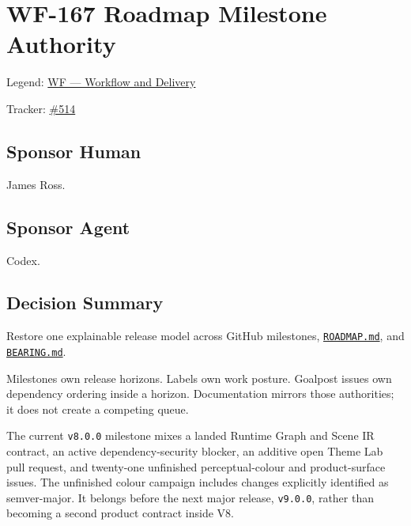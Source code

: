 \chapter{WF-167 Roadmap Milestone Authority}\label{record-249}

\smallskip

Legend: \href{https://github.com/flyingrobots/bijou/blob/1853ad902f6bf219326409e7f743a5a1d6517dbc/docs/legends/WF-workflow-and-delivery.md}{WF --- Workflow and Delivery}

Tracker: \href{https://github.com/flyingrobots/bijou/issues/514}{\#514}

\section{Sponsor Human}\label{record-249-sponsor-human}

James Ross.

\section{Sponsor Agent}\label{record-249-sponsor-agent}

Codex.

\section{Decision Summary}\label{record-249-decision-summary}

Restore one explainable release model across GitHub milestones, \href{https://github.com/flyingrobots/bijou/blob/5b10cb89165b76673ffc60da59d7de5a531e55e9/docs/ROADMAP.md}{\texttt{R\allowbreak{}O\allowbreak{}A\allowbreak{}D\allowbreak{}M\allowbreak{}A\allowbreak{}P\allowbreak{}.\allowbreak{}m\allowbreak{}d}}, and \href{https://github.com/flyingrobots/bijou/blob/5b10cb89165b76673ffc60da59d7de5a531e55e9/docs/BEARING.md}{\texttt{B\allowbreak{}E\allowbreak{}A\allowbreak{}R\allowbreak{}I\allowbreak{}N\allowbreak{}G\allowbreak{}.\allowbreak{}m\allowbreak{}d}}.

Milestones own release horizons. Labels own work posture. Goalpost issues own dependency ordering inside a horizon. Documentation mirrors those authorities; it does not create a competing queue.

The current \texttt{v\allowbreak{}8\allowbreak{}.\allowbreak{}0\allowbreak{}.\allowbreak{}0} milestone mixes a landed Runtime Graph and Scene IR contract, an active dependency-security blocker, an additive open Theme Lab pull request, and twenty-one unfinished perceptual-colour and product-surface issues. The unfinished colour campaign includes changes explicitly identified as semver-major. It belongs before the next major release, \texttt{v\allowbreak{}9\allowbreak{}.\allowbreak{}0\allowbreak{}.\allowbreak{}0}, rather than becoming a second product contract inside V8.

